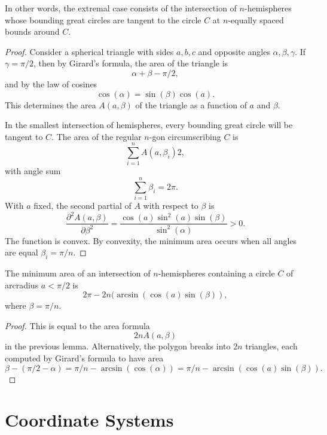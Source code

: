 In other words, the extremal case consists of the intersection of $n$-hemispheres whose bounding great circles are tangent to the circle $C$ at $n$-equally spaced bounds around $C$.

\begin{proof} 
Consider a spherical triangle with sides $a,b,c$ and opposite angles $\alpha,\beta,\gamma$.  If $\gamma=\pi/2$, then by Girard's formula, the area
of the triangle is
$$
\alpha+\beta-\pi/2,
$$
and by the law of cosines 
$$
\cos(\alpha) =\sin(\beta)\cos(a).
$$
This determines the area $A(a,\beta)$ of the triangle 
as a function of $a$ and $\beta$.

In the smallest intersection of hemispheres,  every bounding great circle will be tangent to $C$.
The area of the regular $n$-gon circumscribing $C$ is
$$
\sum_{i=1}^n A(a,\beta_i) 2,
$$
with angle sum
$$
\sum_{i=1}^n \beta_i = 2\pi.
$$
With  $a$ fixed, the second partial of $A$ with respect to $\beta$ is
$$
\frac{\partial^2 A(a,\beta)}{\partial \beta^2} = \frac{\cos(a)\sin^2(a)\sin(\beta)}{\sin^2(\alpha)} > 0.
$$
The function is convex.
By convexity, the minimum area occurs when all angles are equal
$\beta_i = \pi/n$.
\end{proof}

\begin{lemma}\label{lemma:ngon-area}
The minimum area of an intersection of $n$-hemispheres containing a circle $C$ 
of arcradius $a<\pi/2$ is
$$
2\pi - 2 n (\arcsin(\cos(a)\sin(\beta)),
$$
where $\beta = \pi/n$.
\end{lemma}

\begin{proof} This is equal to the area formula
$$
2 n A(a,\beta)
$$
in the previous lemma.
Alternatively, the polygon breaks into $2n$ triangles, each computed by Girard's
formula to have area
$$
\beta - (\pi/2 - \alpha)  = \pi/n - \arcsin(\cos(\alpha)) = 
\pi/n - \arcsin(\cos(a)\sin(\beta)).
$$
\end{proof}




\section{Coordinate Systems}

